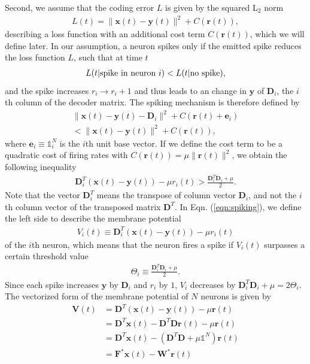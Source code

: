 \documentclass[twoside,twocolumn]{article}
\renewcommand{\b}[1]{\textbf{#1}}
\newcommand{\tn}[1]{\textnormal{#1}}
\begin{document}
Second, we assume that the coding error $L$ is given by the squared L$_2$ norm 
\begin{align}
L(t) = \|\b{x}(t)-\b{y}(t)\|^2 + C(\b{r}(t)), 
\label{eqn:loss}
\end{align}
describing a loss function with an additional cost term $C(\b{r}(t))$, which we will define later. In our assumption, a neuron spikes only if the emitted spike reduces the loss function $L$, such that at time $t$
\begin{align}
L(t|\tn{spike in neuron }i) < L(t|\tn{no spike}),
\end{align} 
and the spike increases $r_i\rightarrow r_i+1$ and thus leads to an change in $\b{y}$ of $\b{D}_i$, the $i$th column of the decoder matrix. The spiking mechanism is therefore defined by
\begin{align}
 \|\b{x}(t)-\b{y}(t) - \b{D}_i\|^2 + C(\b{r}(t)+\b{e}_i) \nonumber \\ <   \|\b{x}(t)-\b{y}(t)\|^2 + C(\b{r}(t)),
\end{align}
where $\b{e}_i \equiv \mathbb{1}^N_i$ is the $i$th unit base vector. If we define the cost term to be a quadratic cost of firing rates with $C(\b{r}(t)) = \mu \|\b{r}(t)\|^2$, we obtain the following inequality
\begin{align}
\b{D}^T_i\left(\b{x}(t) - \b{y}(t)\right)  - \mu r_i(t)  > \frac{\b{D}^T_i \b{D}_i + \mu}{2}.
\label{eqn:spiking}
\end{align}
Note that the vector $\b{D}^T_i$ means the transpose of column vector $\b{D}_i$, and not the $i$th column vector of the transposed matrix $\b{D}^T$. In Eqn. (\ref{eqn:spiking}), we define the left side to describe the membrane potential 
\begin{align}
V_i(t) \equiv \b{D}^T_i\left(\b{x}(t) - \b{y}(t)\right)  - \mu r_i(t)
\end{align}
of the $i$th neuron, which means that the neuron fires a spike if $V_i(t)$ surpasses a certain threshold value
\begin{align}
\Theta_i \equiv  \frac{\b{D}^T_i \b{D}_i + \mu}{2}.
\end{align}
Since each spike increases $\b{y}$ by $\b{D}_i$ and $r_i$ by $1$, $V_i$ decreases by $\b{D}^T_i\b{D}_i + \mu = 2 \Theta_i$. The vectorized form of the membrane potential of $N$ neurons is given by 
\begin{align}
\b{V}(t) &= \b{D}^T\left(\b{x}(t) - \b{y}(t)\right)  - \mu \b{r}(t) \nonumber \\
			  &= \b{D}^T\b{x}(t) - \b{D}^T \b{D}\b{r}(t) - \mu \b{r}(t) \nonumber \\
			  &= \b{D}^T\b{x}(t) - (\b{D}^T \b{D}  + \mu \mathbb{1}^N) \b{r}(t) \nonumber \\
			  &= \b{F}^*\b{x}(t) - \b{W}^*\b{r}(t)
			  \label{eqn:voltage}
\end{align}
\end{document}
